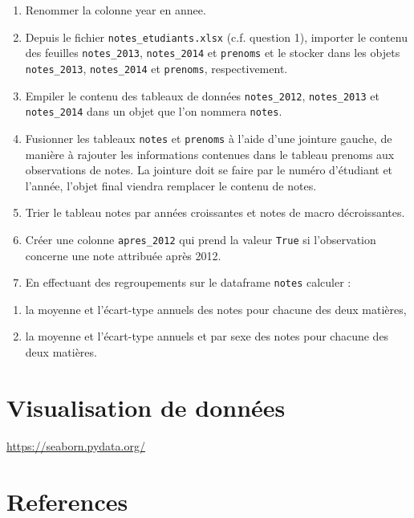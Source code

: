 \documentclass[12pt,]{book}
\providecommand{\tightlist}{%
  \setlength{\itemsep}{0pt}\setlength{\parskip}{0pt}}
\numberwithin{equation}{section}
\numberwithin{countremarque}{section}
\begin{document}
\begin{enumerate}
\def\labelenumi{\arabic{enumi}.}
\setcounter{enumi}{9}
\tightlist
\item
  Renommer la colonne year en annee.
\item
  Depuis le fichier \texttt{notes\_etudiants.xlsx} (c.f. question 1),
  importer le contenu des feuilles \texttt{notes\_2013},
  \texttt{notes\_2014} et \texttt{prenoms} et le stocker dans les objets
  \texttt{notes\_2013}, \texttt{notes\_2014} et \texttt{prenoms},
  respectivement.
\item
  Empiler le contenu des tableaux de données \texttt{notes\_2012},
  \texttt{notes\_2013} et \texttt{notes\_2014} dans un objet que l'on
  nommera \texttt{notes}.
\item
  Fusionner les tableaux \texttt{notes} et \texttt{prenoms} à l'aide
  d'une jointure gauche, de manière à rajouter les informations
  contenues dans le tableau prenoms aux observations de notes. La
  jointure doit se faire par le numéro d'étudiant et l'année, l'objet
  final viendra remplacer le contenu de notes.
\item
  Trier le tableau notes par années croissantes et notes de macro
  décroissantes.
\item
  Créer une colonne \texttt{apres\_2012} qui prend la valeur
  \texttt{True} si l'observation concerne une note attribuée après 2012.
\item
  En effectuant des regroupements sur le dataframe \texttt{notes}
  calculer :
\end{enumerate}

\begin{enumerate}
\def\labelenumi{(\alph{enumi})}
\tightlist
\item
  la moyenne et l'écart-type annuels des notes pour chacune des deux
  matières,
\item
  la moyenne et l'écart-type annuels et par sexe des notes pour chacune
  des deux matières.
\end{enumerate}

\chapter{Visualisation de données}\label{visualisation-de-donnees}

\url{https://seaborn.pydata.org/}

\chapter{References}\label{references}
\end{document}
